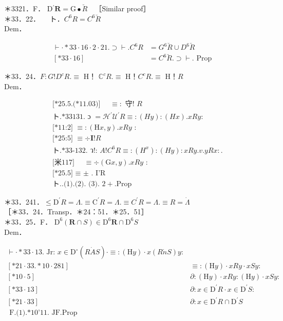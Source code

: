 \documentclass[10pt]{article}
\begin{document}
＊3321．F． $\mathrm{D}{ }^{\prime} \boldsymbol{R}=\mathrm{G} \bullet \breve{R} \quad$［Similar proof］\\
＊33．22．$\quad$ ト．$C^{6} R=C^{6} \breve{R}$\\
Dem．

$$
\begin{aligned}
\vdash \cdot * 33 \cdot 16 \cdot 2 \cdot 21 . \supset \vdash . C^{6} R & =G^{6} \breve{R} \cup D^{6} \breve{R} \\
{[* 33 \cdot 16] } & =C^{6} \breve{R} . \supset \vdash . \text { Prop }
\end{aligned}
$$

＊33．24．$F: G!D^{c} R . \equiv$ H！ $\mathbb{C}^{c} R . \equiv$ H！$C^{c} R . \equiv$ H！$R$\\
Dem．


\begin{align*}
& \text { [*25.5.(*11.03)] } \quad \equiv: \text { 守! } R  \tag{1}\\
& \text { ト.*33131. ɔ }=\mathcal{H}^{\prime} \mathcal{U}^{\prime} R \equiv:(H y):(H x) . x R y: \\
& \text { [*11:2] } \equiv:(\mathrm{H} x, y) . x R y \text { : } \\
& \text { [*25:5] } \equiv \div \mathbf{I}!R  \tag{2}\\
& \text { ト.*33-132. ว!: } A!C^{6} R \equiv:\left(H^{x}\right):(H y): x R y . v . y R x: . \\
& \text { [米117] } \quad \equiv \div(\mathrm{G} x, y) . x R y \text { : } \\
& \text { [*25.5] } \equiv \text { ± . I'R }  \tag{3}\\
& \text { ト..(1).(2). (3). } 2+\text {.Prop }
\end{align*}


＊33．241．$\leqslant \mathrm{D}^{\prime} R=\Lambda . \equiv \mathrm{C}^{\prime} R=\Lambda . \equiv C^{\prime} R=\Lambda . \equiv R=\dot{\Lambda}$\\
［＊33．24．Transp．＊24：51．＊25．51］\\
＊33．25．F． $\mathrm{D}^{6}(\boldsymbol{R} \cap S) \in \mathrm{D}^{6} \boldsymbol{R} \cap \mathrm{D}^{6} S$\\
Dem．

\[
\begin{array}{ll}
\vdash \cdot * 33 \cdot 13 . \text { Jr: } x \in \mathrm{D}^{\circ}(R \dot{A} S) \cdot \equiv:(\mathrm{H} y) \cdot x(R \dot{n} S) y: \\
{[* 21 \cdot 33 . * 10 \cdot 281]} & \equiv:(\mathrm{H} y) \cdot x R y \cdot x S y: \\
{[* 10 \cdot 5]} & \partial:(\mathrm{H} y) \cdot x R y:(\mathrm{H} y) \cdot x S y: \\
{[* 33 \cdot 13]} & \partial: x \in \mathrm{D}^{\prime} R \cdot x \in \mathrm{D}^{\prime} S: \\
{[* 21 \cdot 33]} & \partial: x \in \mathrm{D}^{\prime} R \cap \mathrm{D}^{\prime} S  \tag{1}\\
\text { F.(1).*10'11. JF.Prop } &
\end{array}
\]
\end{document}
